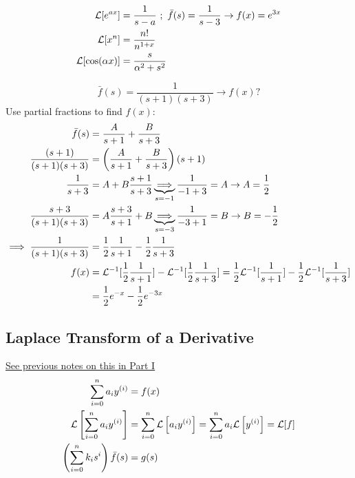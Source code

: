 \documentclass[Maths.tex]{subfiles}
\begin{document}
\begin{example}
\begin{align}
    \mathcal{L}[e^{ax}] &= \frac{1}{s - a} ~;~ \bar{f}(s) = \frac{1}{s - 3} \to f(x) = e^{3x} \\
    \mathcal{L}[x^n] &= \frac{n!}{n^{1 + x}} \\
    \mathcal{L}[\cos(\alpha x)] &= \frac{s}{\alpha^2 + s^2}
\end{align}
\end{example}

\begin{example}
\begin{equation}
    \bar{f}(s) = \frac{1}{(s + 1)(s + 3)} \to f(x)?
\end{equation}
Use partial fractions to find $f(x)$:
\begin{align}
    \bar{f}(s) &= \frac{A}{s + 1} + \frac{B}{s + 3} \\
    \frac{(s + 1)}{(s + 1)(s + 3)} &= \left(\frac{A}{s + 1} + \frac{B}{s + 3}\right)(s + 1) \\
    \frac{1}{s + 3} &= A + B\frac{s + 1}{s + 3} \underbrace{\implies}_{s = -1} \frac{1}{-1 + 3} = A \to A = \frac{1}{2} \\
    \frac{s + 3}{(s + 1)(s + 3)} &= A\frac{s + 3}{s + 1} + B \underbrace{\implies}_{s = -3} \frac{1}{-3 + 1} = B \to B = -\frac{1}{2} \\
    \implies \frac{1}{(s + 1)(s + 3)} &= \frac{1}{2}\frac{1}{s + 1} - \frac{1}{2}\frac{1}{s + 3} \\
    f(x) &= \mathcal{L}^{-1}[\frac{1}{2}\frac{1}{s + 1}] - \mathcal{L}^{-1}[\frac{1}{2}\frac{1}{s + 3}] = \frac{1}{2}\mathcal{L}^{-1}[\frac{1}{s + 1}] - \frac{1}{2}\mathcal{L}^{-1}[\frac{1}{s + 3}] \\
    &= \frac{1}{2}e^{-x} - \frac{1}{2}e^{-3x}
\end{align}
\end{example}

\subsection{Laplace Transform of a Derivative}
\hyperlink{page.39}{See previous notes on this in Part \RN{1}}
\begin{align}
    \sum_{i = 0}^n a_i y^{(i)} &= f(x) \\
    \mathcal{L}\left[\sum_{i = 0}^n a_i y^{(i)}\right] &= \sum_{i = 0}^n \mathcal{L}\left[a_i y^{(i)}\right] = \sum_{i = 0}^n a_i \mathcal{L}\left[y^{(i)}\right] = \mathcal{L}[f] \\
    \left(\sum_{i = 0}^n k_i s^i\right)\bar{f}(s) &= g(s)
\end{align}
\end{document}
